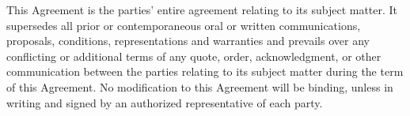 This Agreement is the parties' entire agreement relating to its subject matter. It supersedes all prior or contemporaneous oral or written communications, proposals, conditions, representations and warranties and prevails over any conflicting or additional terms of any quote, order,  acknowledgment, or other communication between the parties relating to its subject matter during the term of this Agreement. No modification to this Agreement will be binding, unless in writing and signed by an authorized representative of each party.
